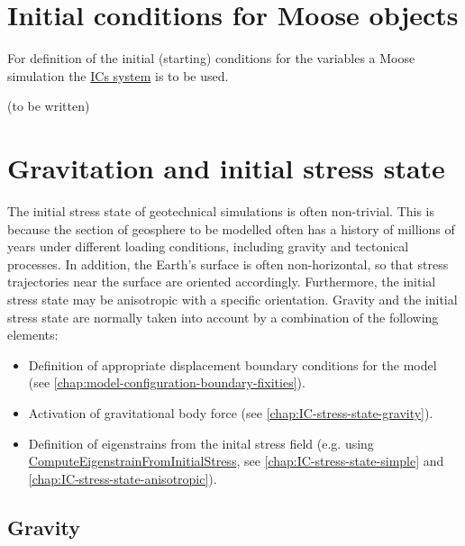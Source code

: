 \section{Initial conditions for Moose objects}
\label{chap:IC-moose-objects}

For definition of the initial (starting) conditions for the variables a Moose
simulation the \href{https://mooseframework.inl.gov/syntax/ICs}{ICs system} is
to be used.

(to be written)

\section{Gravitation and initial stress state}
\label{chap:IC-stress-state}

The initial stress state of geotechnical simulations is often non-trivial. This
is because the section of geosphere to be modelled often has a history of
millions of years under different loading conditions, including gravity and
tectonical processes. In addition, the Earth's surface is often non-horizontal,
so that stress trajectories near the surface are oriented accordingly.
Furthermore, the initial stress state may be anisotropic with a specific
orientation. Gravity and the initial stress state are normally taken into
account by a combination of the following elements:

\begin{itemize}
  \item Definition of appropriate displacement boundary conditions for the model (see
        \autoref{chap:model-configuration-boundary-fixities}).
  \item Activation of gravitational body force (see
        \autoref{chap:IC-stress-state-gravity}).
  \item Definition of eigenstrains from the inital stress field (e.g. using
        \href{https://mooseframework.inl.gov/source/materials/ComputeEigenstrainFromInitialStress.html}{ComputeEigenstrainFromInitialStress},
        see \autoref{chap:IC-stress-state-simple} and
        \autoref{chap:IC-stress-state-anisotropic}).
\end{itemize}

\subsection{Gravity}
\label{chap:IC-stress-state-gravity}


